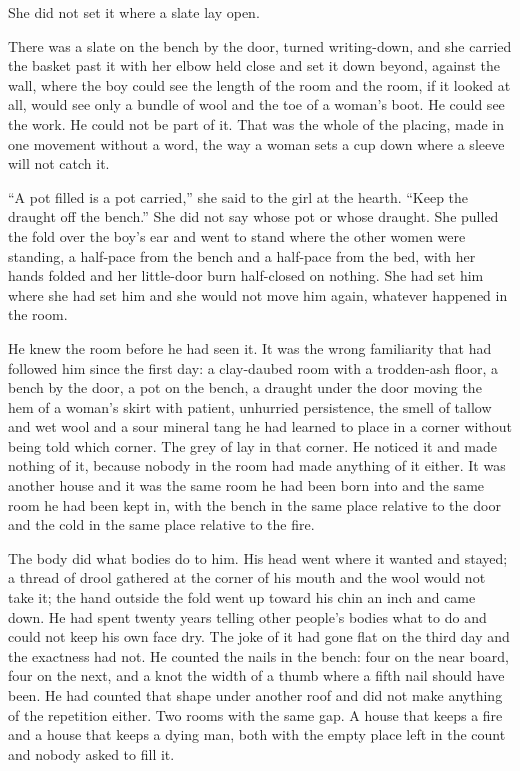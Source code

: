 She did not set it where a slate lay open.

There was a slate on the bench by the door, turned writing-down, and she carried the basket past it with her elbow held close and set it down beyond, against the wall, where the boy could see the length of the room and the room, if it looked at all, would see only a bundle of wool and the toe of a woman's boot. He could see the work. He could not be part of it. That was the whole of the placing, made in one movement without a word, the way a woman sets a cup down where a sleeve will not catch it.

“A pot filled is a pot carried,” she said to the girl at the hearth. “Keep the draught off the bench.” She did not say whose pot or whose draught. She pulled the fold over the boy's ear and went to stand where the other women were standing, a half-pace from the bench and a half-pace from the bed, with her hands folded and her little-door burn half-closed on nothing. She had set him where she had set him and she would not move him again, whatever happened in the room.

He knew the room before he had seen it. It was the wrong familiarity that had followed him since the first day: a clay-daubed room with a trodden-ash floor, a bench by the door, a pot on the bench, a draught under the door moving the hem of a woman's skirt with patient, unhurried persistence, the smell of tallow and wet wool and a sour mineral tang he had learned to place in a corner without being told which corner. The grey of  lay in that corner. He noticed it and made nothing of it, because nobody in the room had made anything of it either. It was another house and it was the same room he had been born into and the same room he had been kept in, with the bench in the same place relative to the door and the cold in the same place relative to the fire.

The body did what bodies do to him. His head went where it wanted and stayed; a thread of drool gathered at the corner of his mouth and the wool would not take it; the hand outside the fold went up toward his chin an inch and came down. He had spent twenty years telling other people's bodies what to do and could not keep his own face dry. The joke of it had gone flat on the third day and the exactness had not. He counted the nails in the bench: four on the near board, four on the next, and a knot the width of a thumb where a fifth nail should have been. He had counted that shape under another roof and did not make anything of the repetition either. Two rooms with the same gap. A house that keeps a fire and a house that keeps a dying man, both with the empty place left in the count and nobody asked to fill it.


